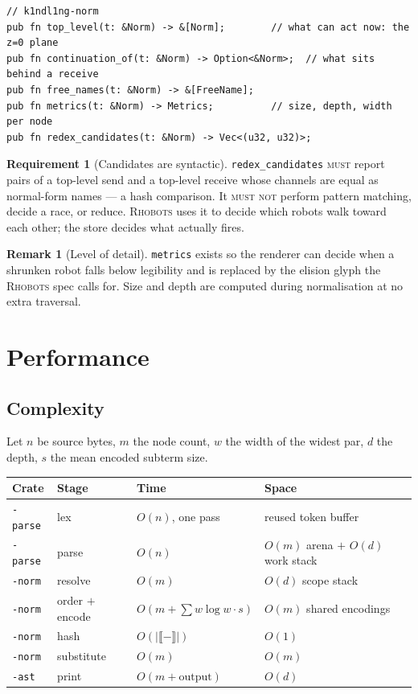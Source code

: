 \documentclass[11pt,a4paper]{article}
\newcommand{\code}[1]{\texttt{#1}}
\newcommand{\Rhobots}{\textsc{Rhobots}}
\newcommand{\MUST}{\textsc{must}}
\newcommand{\MUSTNOT}{\textsc{must not}}
\newcommand{\enc}[1]{\llbracket #1 \rrbracket}
\theoremstyle{definition}
\newtheorem{requirement}[definition]{Requirement}
\newtheorem{remark}[definition]{Remark}
\theoremstyle{plain}
\begin{document}
\begin{lstlisting}
// k1ndl1ng-norm
pub fn top_level(t: &Norm) -> &[Norm];        // what can act now: the z=0 plane
pub fn continuation_of(t: &Norm) -> Option<&Norm>;  // what sits behind a receive
pub fn free_names(t: &Norm) -> &[FreeName];
pub fn metrics(t: &Norm) -> Metrics;          // size, depth, width per node
pub fn redex_candidates(t: &Norm) -> Vec<(u32, u32)>;
\end{lstlisting}

\begin{requirement}[Candidates are syntactic]
\code{redex\_candidates} \MUST{} report pairs of a top-level send and a
top-level receive whose channels are equal as normal-form names --- a hash
comparison. It \MUSTNOT{} perform pattern matching, decide a race, or reduce.
\Rhobots{} uses it to decide which robots walk toward each other; the store
decides what actually fires.
\end{requirement}

\begin{remark}[Level of detail]
\code{metrics} exists so the renderer can decide when a shrunken robot falls
below legibility and is replaced by the elision glyph the \Rhobots{} spec calls
for. Size and depth are computed during normalisation at no extra traversal.
\end{remark}

\section{Performance}\label{sec:perf}

\subsection{Complexity}

Let $n$ be source bytes, $m$ the node count, $w$ the width of the widest par,
$d$ the depth, $s$ the mean encoded subterm size.

\begin{center}
\begin{tabular}{@{}llll@{}}
\toprule
Crate & Stage & Time & Space\\
\midrule
\code{-parse} & lex & $O(n)$, one pass & reused token buffer\\
\code{-parse} & parse & $O(n)$ & $O(m)$ arena $+$ $O(d)$ work stack\\
\code{-norm} & resolve & $O(m)$ & $O(d)$ scope stack\\
\code{-norm} & order $+$ encode & $O(m + \sum w\log w\cdot s)$ & $O(m)$ shared encodings\\
\code{-norm} & hash & $O(|\enc{-}|)$ & $O(1)$\\
\code{-norm} & substitute & $O(m)$ & $O(m)$\\
\code{-ast} & print & $O(m + \text{output})$ & $O(d)$\\
\bottomrule
\end{tabular}
\end{center}
\end{document}
